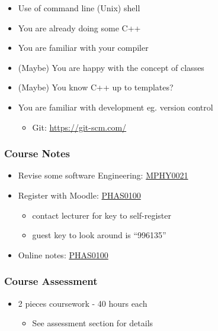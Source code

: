 \begin{itemize}
\tightlist
\item
  Use of command line (Unix) shell
\item
  You are already doing some C++
\item
  You are familiar with your compiler
\item
  (Maybe) You are happy with the concept of classes
\item
  (Maybe) You know C++ up to templates?
\item
  You are familiar with development eg. version control

  \begin{itemize}
  \tightlist
  \item
    Git: \url{https://git-scm.com/}
  \end{itemize}
\end{itemize}

\hypertarget{course-notes}{%
\subsubsection{Course Notes}\label{course-notes}}

\begin{itemize}
\tightlist
\item
  Revise some software Engineering:
  \href{http://github-pages.ucl.ac.uk/rsd-engineeringcourse/}{MPHY0021}
\item
  Register with Moodle: \href{https://moodle.ucl.ac.uk/}{PHAS0100}

  \begin{itemize}
  \tightlist
  \item
    contact lecturer for key to self-register
  \item
    guest key to look around is ``996135''
  \end{itemize}
\item
  Online notes:
  \href{http://rits.github-pages.ucl.ac.uk/research-computing-with-cpp/}{PHAS0100}
\end{itemize}

\hypertarget{course-assessment}{%
\subsubsection{Course Assessment}\label{course-assessment}}

\begin{itemize}
\tightlist
\item
  2 pieces coursework - 40 hours each

  \begin{itemize}
  \tightlist
  \item
    See assessment section for details
  \end{itemize}
\end{itemize}

